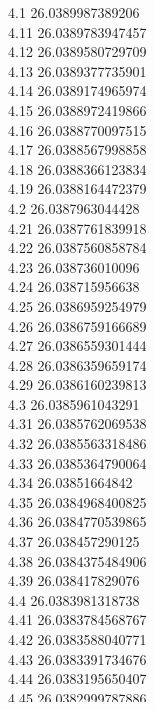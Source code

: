 {4.1	26.0389987389206\\
4.11	26.0389783947457\\
4.12	26.0389580729709\\
4.13	26.0389377735901\\
4.14	26.0389174965974\\
4.15	26.0388972419866\\
4.16	26.0388770097515\\
4.17	26.0388567998858\\
4.18	26.0388366123834\\
4.19	26.0388164472379\\
4.2	26.0387963044428\\
4.21	26.0387761839918\\
4.22	26.0387560858784\\
4.23	26.038736010096\\
4.24	26.038715956638\\
4.25	26.0386959254979\\
4.26	26.0386759166689\\
4.27	26.0386559301444\\
4.28	26.0386359659174\\
4.29	26.0386160239813\\
4.3	26.0385961043291\\
4.31	26.0385762069538\\
4.32	26.0385563318486\\
4.33	26.0385364790064\\
4.34	26.03851664842\\
4.35	26.0384968400825\\
4.36	26.0384770539865\\
4.37	26.038457290125\\
4.38	26.0384375484906\\
4.39	26.038417829076\\
4.4	26.0383981318738\\
4.41	26.0383784568767\\
4.42	26.0383588040771\\
4.43	26.0383391734676\\
4.44	26.0383195650407\\
4.45	26.0382999787886\\
4.46	26.0382804147038\\
4.47	26.0382608727787\\
4.48	26.0382413530053\\
4.49	26.0382218553761\\
4.5	26.038202379883\\
}

